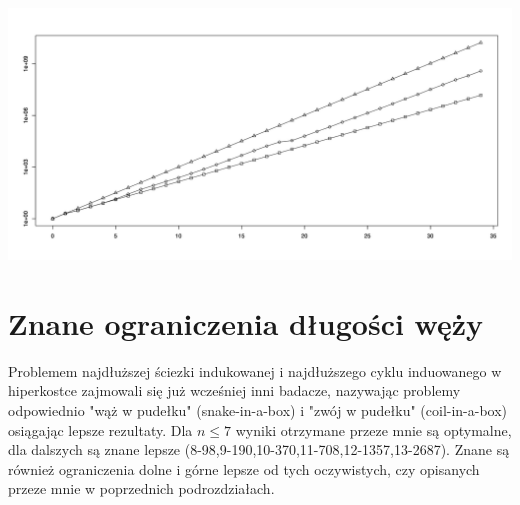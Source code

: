 \documentclass{pracamgr}
\begin{document}
     \begin{center}
      \includegraphics[scale=0.37]{img/plot1.jpg}
     \end{center}
   \section{Znane ograniczenia długości węży}
    Problemem najdłuższej ściezki indukowanej i najdłuższego cyklu induowanego w hiperkostce zajmowali się już wcześniej inni badacze, nazywając
    problemy odpowiednio "wąż w pudełku" (snake-in-a-box) i "zwój w pudełku" (coil-in-a-box) osiągając lepsze rezultaty.
    Dla $n\le7$ wyniki otrzymane przeze mnie są optymalne, dla dalszych są znane lepsze (8-98,9-190,10-370,11-708,12-1357,13-2687).
    Znane są również ograniczenia dolne i górne lepsze od tych oczywistych, czy opisanych przeze mnie w poprzednich podrozdziałach.
\end{document}
